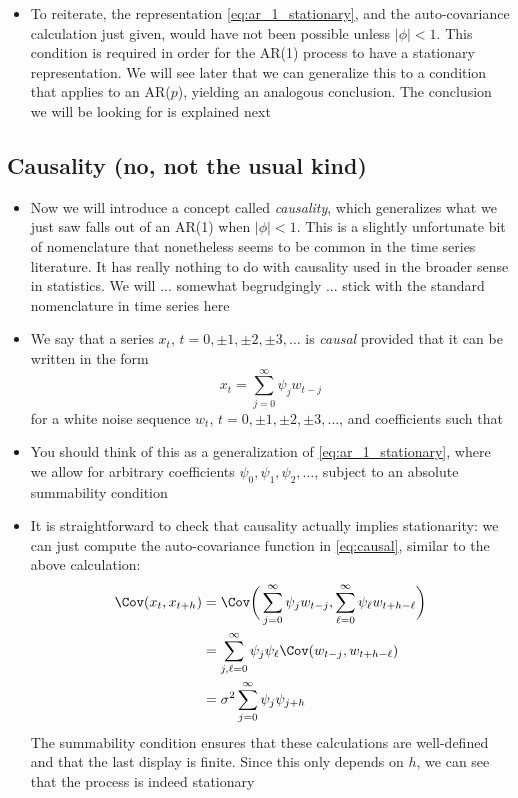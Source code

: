 \documentclass{article}
\begin{document}
\begin{itemize}
\item To reiterate, the representation \eqref{eq:ar_1_stationary}, and the
  auto-covariance calculation just given, would have not been possible unless
  $|\phi| < 1$. This condition is required in order for the AR(1) process to
  have a stationary representation. We will see later that we can generalize
  this to a condition that applies to an AR($p$), yielding an analogous
  conclusion. The conclusion we will be looking for is explained next  
\end{itemize}

\subsection{Causality (no, not the usual kind)}

\begin{itemize}
\item Now we will introduce a concept called \emph{causality}, which generalizes
  what we just saw falls out of an AR(1) when $|\phi| < 1$. This is a slightly
  unfortunate bit of nomenclature that nonetheless seems to be common in the
  time series literature. It has really nothing to do with causality used in the
  broader sense in statistics. We will ... somewhat begrudgingly ... stick with
  the standard nomenclature in time series here  

\item We say that a series $x_t$, $t = 0, \pm 1, \pm 2, \pm 3, \dots$ is
  \emph{causal} provided that it can be written in the form
  \begin{equation}
  \label{eq:causal}
  x_t = \sum_{j=0}^\infty \psi_j w_{t-j}
  \end{equation}
  for a white noise sequence $w_t$, $t = 0, \pm 1, \pm 2, \pm 3, \dots$, and
  coefficients such that   

\item You should think of this as a generalization of
  \eqref{eq:ar_1_stationary}, where we allow for arbitrary coefficients
  $\psi_0,\psi_1,\psi_2,\dots$, subject to an absolute summability condition  

\item It is straightforward to check that causality actually implies
  stationarity: we can just compute the auto-covariance function in
  \eqref{eq:causal}, similar to the above calculation:
    \begin{align*}
  \Cov(x_t, x_{t+h}) &= \Cov\bigg( \sum_{j=0}^\infty \psi_j w_{t-j}, 
  \sum_{\ell=0}^\infty \psi_\ell w_{t+h-\ell} \bigg) \\
  &= \sum_{j,\ell=0}^\infty \psi_j \psi_\ell \Cov( w_{t-j}, w_{t+h-\ell} ) \\
  &= \sigma^2 \sum_{j=0}^\infty \psi_j \psi_{j+h}
  \end{align*}
  The summability condition ensures that these calculations are well-defined and
  that the last display is finite. Since this only depends on $h$, we can see
  that the process is indeed stationary


\end{itemize}
\end{document}
